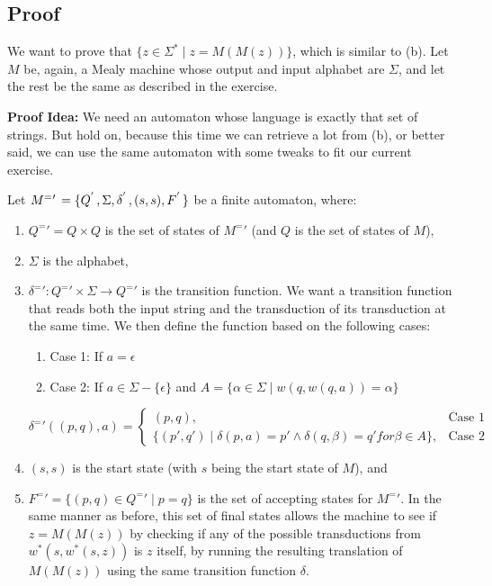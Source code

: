\documentclass[12pt]{article}
\begin{document}
\subsection{Proof}

We want to prove that $\{z \in \Sigma^* \mid z = M(M(z))\}$, which is similar to (b). Let $M$ be, again, a Mealy machine whose output and input alphabet are $\Sigma$, and let the rest be the same as described in the exercise.

\textbf{Proof Idea:} We need an automaton whose language is exactly that set of strings. But hold on, because this time we can retrieve a lot from (b), or better said, we can use the same automaton with some tweaks to fit our current exercise.

Let $M^= {'\hspace{0.05cm}} = \{Q^{'\hspace{0.05cm}}, \Sigma, \delta^{'\hspace{0.05cm}}, (s, s), F^{'\hspace{0.05cm}}\}$ be a finite automaton, where:
\begin{enumerate}
    \item $Q^={'} = Q \times Q$ is the set of states of $M^={'}$ (and $Q$ is the set of states of $M$),
    \item $\Sigma$ is the alphabet,
    \item $\delta^={'} : Q^={'} \times \Sigma \rightarrow Q^={'}$ is the transition function. We want a transition function that reads both the input string and the transduction of its transduction at the same time. We then define the function based on the following cases:
        \begin{enumerate}
            \item Case 1: If $a = \epsilon$
            \item Case 2: If $a \in \Sigma - \{\epsilon\}$ and $A = \{\alpha \in \Sigma \mid w(q, w(q, a)) = \alpha\} $
        \end{enumerate}
        \[
        \delta^={'}((p, q), a) =
        \begin{cases}
            (p, q), & \text{Case 1} \\
            \{ (p', q') \mid \delta(p, a) = p' \land \delta(q, \beta) = q' for \beta \in A \}, & \text{Case 2}
        \end{cases}
        \]
    \item $(s, s)$ is the start state (with $s$ being the start state of $M$), and
    \item $F^={'} = \{(p, q) \in Q^={'} \mid p = q\}$ is the set of accepting states for $M^={'}$. In the same manner as before, this set of final states allows the machine to see if $z = M(M(z))$ by checking if any of the possible transductions from $w^*(s,w^*(s, z))$ is $z$ itself, by running the resulting translation of $M(M(z))$ using the same transition function $\delta$.
\end{enumerate}
\end{document}
